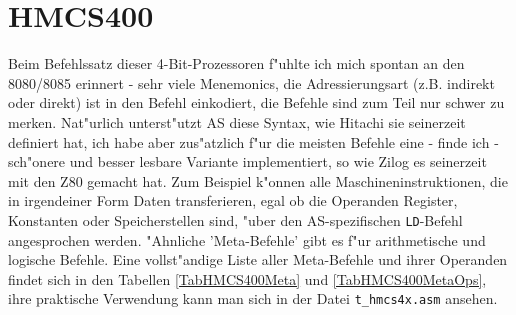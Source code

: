 \documentclass[12pt,a4paper,twoside]{report}
\newcommand{\tty}[1]{{\tt #1}}
\begin{document}
{%

\section{HMCS400}

Beim Befehlssatz dieser 4-Bit-Prozessoren f"uhlte ich mich
spontan an den 8080/8085 erinnert - sehr viele Menemonics, die
Adressierungsart (z.B.  indirekt oder direkt) ist in den Befehl
einkodiert, die Befehle sind zum Teil nur schwer zu merken. 
Nat"urlich unterst"utzt AS diese Syntax, wie Hitachi sie
seinerzeit definiert hat, ich habe aber zus"atzlich f"ur die
meisten Befehle eine - finde ich - sch"onere und besser lesbare
Variante implementiert, so wie Zilog es seinerzeit mit den Z80
gemacht hat.  Zum Beispiel k"onnen alle Maschineninstruktionen,
die in irgendeiner Form Daten transferieren, egal ob die
Operanden Register, Konstanten oder Speicherstellen sind, "uber den
AS-spezifischen \tty{LD}-Befehl angesprochen werden.  "Ahnliche
'Meta-Befehle' gibt es f"ur arithmetische und logische Befehle.
Eine vollst"andige Liste aller Meta-Befehle und ihrer Operanden
findet sich in den Tabellen \ref{TabHMCS400Meta} und 
\ref{TabHMCS400MetaOps}, ihre praktische Verwendung kann man sich
in der Datei \tty{t\_hmcs4x.asm} ansehen.

}
\end{document}
